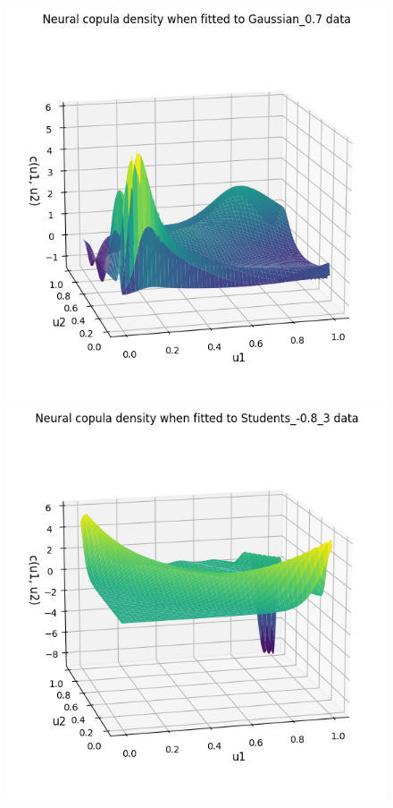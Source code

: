 \documentclass[%
a4paper,							
11pt,								
bibliography=totoc,						
abstracton=true					
]
{scrartcl}
\theoremstyle{plain}
\theoremstyle{definition}
\theoremstyle{remark}
\newcommand{\1}{\mathbbm{1}}
\begin{document}
\begin{figure}[H]
\begin{minipage}{0.49\textwidth}
        \includegraphics[width=\textwidth]{5ResultsDiscussion/pictures/PortfolioTest/GradPort2.png}
    \end{minipage}
    \vfill
    \begin{minipage}{0.49\textwidth}
        \centering
        \includegraphics[width=\textwidth]{5ResultsDiscussion/pictures/PortfolioTest/GradPort3.png}

\end{minipage}
\end{figure}
\end{document}
